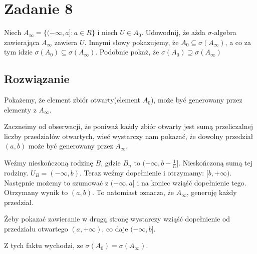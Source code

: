\section{Zadanie 8}
Niech \(A_{\infty} = \{(-\infty, a]: a \in R\}\) i niech \(U \in A_0\). Udowodnij, że ażda \(\sigma\)-algebra zawierająca \(A_{\infty}\) zawiera \(U\). Innymi słowy pokazujemy, że \(A_0 \subseteq \sigma (A_{\infty})\), a co za tym idzie \(\sigma (A_0) \subseteq \sigma (A_{\infty})\). Podobnie pokaż, że \(\sigma (A_0) \supseteq \sigma (A_{\infty})\)

\subsection*{Rozwiązanie}
Pokażemy, że element zbiór otwarty(element \(A_0\)), może być generowany przez elementy z \(A_{\infty}\).

Zaczneimy od obserwacji, że poniważ każdy zbiór otwarty jest sumą przeliczalnej liczby przedziałów otwartych, wieć wystarczy nam pokazać, że dowolny przedział \((a, b)\) może być generowany przez \(A_{\infty}\).

Weźmy nieskończoną rodzinę \(B\), gdzie \(B_n\) to \((-\infty, b - \frac{1}{n}]\). Nieskończoną sumą tej rodziny. \(U_B = (-\infty, b)\). Teraz weźmy dopełnienie i otrzymamy: \([b, +\infty)\). Następnie możemy to szumować z \((-\infty, a]\) i na koniec wziąść dopełnienie tego. Otrzymany wynik to \((a, b)\). To natomiast oznacza, że \(A_{\infty}\), generuję każdy przedział.

Żeby pokazać zawieranie w drugą stronę wystarczy wziąść dopełnienie od przedziału otwartego \((a, +\infty)\), co daje \((-\infty, b]\).

Z tych faktu wychodzi, ze \(\sigma (A_0) = \sigma (A_{\infty})\).
